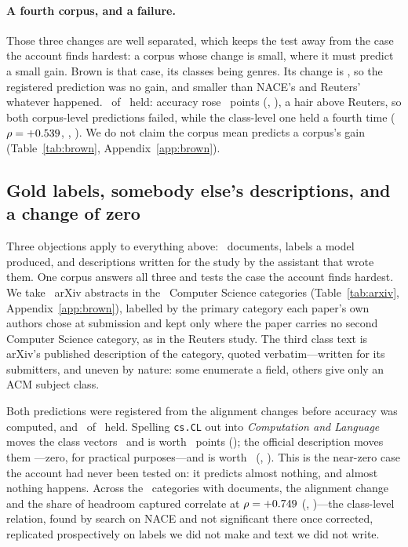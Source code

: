\documentclass[11pt]{article}
\begin{document}
\paragraph{A fourth corpus, and a failure.} Those three changes are well
separated, which keeps the test away from the case the account finds hardest: a
corpus whose change is small, where it must predict a small gain. Brown is that
case, its classes being genres. Its change is \BrownAlign, so the registered
prediction was no gain, and smaller than NACE's and Reuters' whatever happened.
\BrownHeld\ of \BrownPredictions\ held: accuracy rose \BrownDefGain~points
(\BrownDefPStat, \HolmBrownDefStat), a hair above Reuters, so both
corpus-level predictions failed, while the class-level one held a fourth time
($\rho = +0.539$, \BrownRhoPStat, \HolmBrownRhoStat). We do not claim the
corpus mean predicts a corpus's gain (Table~\ref{tab:brown},
Appendix~\ref{app:brown}).

\subsection{Gold labels, somebody else's descriptions, and a change of zero}
\label{sec:arxiv}

Three objections apply to everything above: \NEVAL\ documents, labels a model
produced, and descriptions written for the study by the assistant that wrote
them. One corpus answers all three and tests the case the account finds hardest.
We take \ArxivN\ arXiv abstracts in the \ArxivClasses\ Computer Science
categories (Table~\ref{tab:arxiv}, Appendix~\ref{app:brown}), labelled by the
primary category each paper's own authors chose at submission and kept only where the paper carries no second Computer Science
category, as in the Reuters study. The third class text is arXiv's published
description of the category, quoted verbatim---written for its submitters, and
uneven by nature: some enumerate a field, others give only an ACM subject
class.

Both predictions were registered from the alignment changes before accuracy was
computed, and \ArxivHeld\ of \ArxivPredictions\ held. Spelling \texttt{cs.CL}
out into \emph{Computation and Language} moves the class vectors
\ArxivSpellAlign\ and is worth \ArxivSpellGain~points (\ArxivSpellPStat); the
official description moves them \ArxivDescAlign---zero, for practical
purposes---and is worth \ArxivDescGain\ (\ArxivDescPStat,
\HolmArxivDescStat). This is the near-zero case the account had never been
tested on: it predicts almost nothing, and almost nothing happens. Across the
\ArxivRhoN\ categories with documents, the alignment change and the share of
headroom captured correlate at $\rho = +0.749$ (\ArxivRhoPStat,
\HolmArxivRhoStat)---the class-level relation, found by search on NACE and not
significant there once corrected, replicated prospectively on labels we did not
make and text we did not write.
\end{document}
